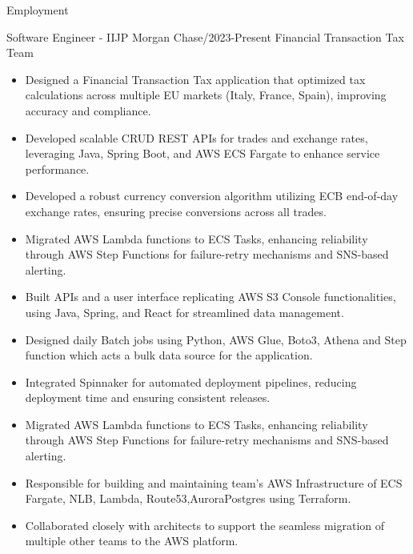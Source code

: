 \documentclass[]{mcdowellcv}
\begin{document}
    \begin{cvsection}{Employment}

        \begin{cvsubsection}{Software Engineer - II}{JP Morgan Chase}{/2023-Present}
            Financial Transaction Tax Team
            \begin{itemize}
                \item Designed a Financial Transaction Tax application that optimized tax calculations across multiple EU markets (Italy, France, Spain), improving accuracy and compliance.
                \item Developed scalable CRUD REST APIs for trades and exchange rates, leveraging Java, Spring Boot, and AWS ECS Fargate to enhance service performance.
                \item Developed a robust currency conversion algorithm utilizing ECB end-of-day exchange rates, ensuring precise conversions across all trades.
                \item Migrated AWS Lambda functions to ECS Tasks, enhancing reliability through AWS Step Functions for failure-retry mechanisms and SNS-based alerting.
                \item Built APIs and a user interface replicating AWS S3 Console functionalities, using Java, Spring, and React for streamlined data management.
                \item Designed daily Batch jobs using Python, AWS Glue, Boto3, Athena and Step function which acts a bulk data source for the application.
                \item Integrated Spinnaker for automated deployment pipelines, reducing deployment time and ensuring consistent releases.
                \item Migrated AWS Lambda functions to ECS Tasks, enhancing reliability through AWS Step Functions for failure-retry mechanisms and SNS-based alerting.
                \item Responsible for building and maintaining team's AWS Infrastructure of ECS Fargate, NLB, Lambda, Route53,AuroraPostgres using Terraform.
                \item Collaborated closely with architects to support the seamless migration of multiple other teams to the AWS platform.


\end{itemize}
\end{cvsubsection}
\end{cvsection}
\end{document}
